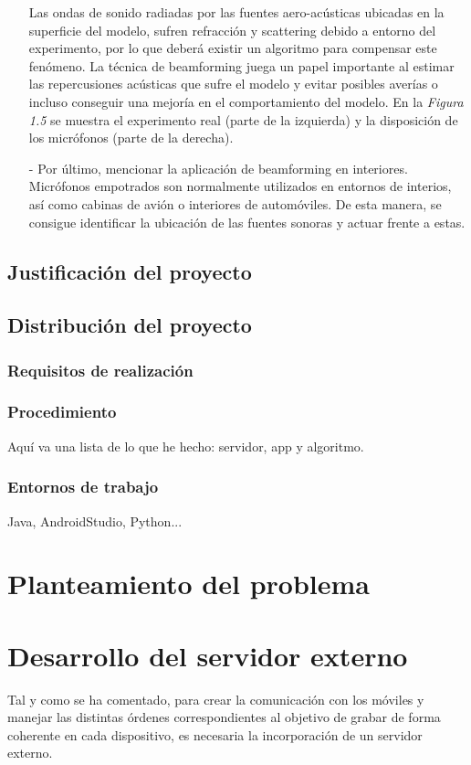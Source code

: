 \documentclass[a4paper,11pt]{book}
\begin{document}
\begin{itemize}
			Las ondas de sonido radiadas por las fuentes aero-acústicas ubicadas en la superficie del modelo, sufren refracción y scattering debido a entorno del experimento, por lo que deberá existir un algoritmo para compensar este fenómeno. La técnica de beamforming juega un papel importante al estimar las repercusiones acústicas que sufre el modelo y evitar posibles averías o incluso conseguir una mejoría en el comportamiento del modelo. En la \textit{Figura 1.5} se muestra el experimento real (parte de la izquierda) y la disposición de los micrófonos (parte de la derecha).
				\item[-] Por último, mencionar la aplicación de beamforming en interiores. Micrófonos empotrados son normalmente utilizados en entornos de interios, así como cabinas de avión o interiores de automóviles. De esta manera, se consigue identificar la ubicación de las fuentes sonoras y actuar frente a estas.
			\end{itemize}
			
	
	\section{Justificación del proyecto}
	\section{Distribución del proyecto}
		\subsection{Requisitos de realización}
		\subsection{Procedimiento}
		Aquí va una lista de lo que he hecho: servidor, app y algoritmo.
		\subsection{Entornos de trabajo}
		Java, AndroidStudio, Python...
\chapter{Planteamiento del problema}

\chapter{Desarrollo del servidor externo}
	Tal y como se ha comentado, para crear la comunicación con los móviles y manejar las distintas órdenes correspondientes al objetivo de grabar de forma coherente en cada dispositivo, es necesaria la incorporación de un servidor externo.
	
\end{document}

